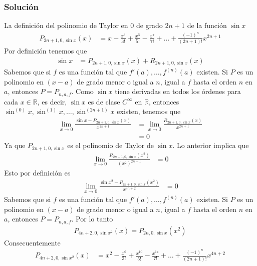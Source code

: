 \documentclass[a4paper]{article}
\begin{document}
\subsubsection*{Solución}
La definición del polinomio de Taylor en \(0\) de grado \(2n + 1\) de la función \(\sin{x}\)
\begin{align*}
    P_{2n + 1, 0, \sin{x}}(x) &= x - \frac{x^3}{3!} + \frac{x^5}{5!} - \frac{x^7}{7!} + \dotsc + \frac{(-1)^n}{(2n + 1)!}x^{2n+1}
\end{align*}
Por definición tenemos que 
\begin{align*}
    \sin{x} &= P_{2n + 1, 0, \sin{x}}(x) + R_{2n + 1, 0, \sin{x}}(x)
\end{align*}
Sabemos que si \(f\) es una función tal que \(f'(a), \dotsc, f^{(n)}(a)\) existen. Si 
\(P\) es un polinomio en \((x-a)\) de grado menor o igual a \(n\), igual a \(f\) 
hasta el orden \(n\) en \(a\), entonces \(P = P_{n, a, f}\).
Como \(\sin{x}\) tiene derivadas en todos los órdenes para cada 
\(x \in \mathbb{R}\), es decir, \(\sin{x}\) es de clase \(C^{\infty}\) en \(\mathbb{R}\), 
entonces \(\sin^{(0)}{x}, \sin^{(1)}{x}, \dotsc, \sin^{(2n + 1)}{x}\) existen, tenemos que 
\begin{align*}
    \lim_{x \to 0} \frac{\sin{x} - P_{2n + 1, 0, \sin{x}}(x)}{x^{2n + 1}} &= \lim_{x \to 0} \frac{R_{2n + 1, 0, \sin{x}}(x)}{x^{2n + 1}}\\
    &= 0
\end{align*}
Ya que \(P_{2n + 1, 0, \sin{x}}\) es el polinomio de Taylor de \(\sin{x}\).
\newline
Lo anterior implica que
\begin{align*}
    \lim_{x \to 0} \frac{R_{2n + 1, 0, \sin{x}}(x^2)}{(x^2)^{2n + 1}} &= 0
\end{align*}
Esto por definición es
\begin{align*}
    \lim_{x \to 0} \frac{\sin{x^2} - P_{2n + 1, 0, \sin{x}}(x^2)}{x^{4n + 2}} &= 0
\end{align*}
Sabemos que si \(f\) es una función tal que \(f'(a), \dotsc, f^{(n)}(a)\) existen. Si 
\(P\) es un polinomio en \((x-a)\) de grado menor o igual a \(n\), igual a \(f\) 
hasta el orden \(n\) en \(a\), entonces \(P = P_{n, a, f}\).
Por lo tanto 
\begin{align*}
    P_{4n + 2, 0, \sin{x^2}}(x) = P_{2n, 0, \sin{x}}(x^2)
\end{align*}
Consecuentemente 
\begin{align*}
    P_{4n + 2, 0, \sin{x^2}}(x) &= x^2 - \frac{x^6}{3!} + \frac{x^{10}}{5!} - \frac{x^{14}}{7!} + \dotsc + \frac{(-1)^n}{(2n + 1)!}x^{4n+2} \\
\end{align*}
\newpage
\end{document}
